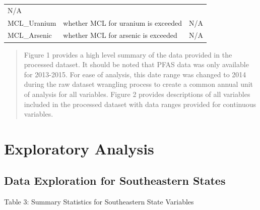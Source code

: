 \documentclass[12pt,]{article}
\begin{document}
\begin{longtable}[]{@{}lll@{}}
\begin{minipage}[t]{0.23\columnwidth}
N/A\strut
\end{minipage}\tabularnewline
\begin{minipage}[t]{0.22\columnwidth}\raggedright
MCL\_Uranium\strut
\end{minipage} & \begin{minipage}[t]{0.46\columnwidth}\raggedright
whether MCL for uranium is exceeded\strut
\end{minipage} & \begin{minipage}[t]{0.23\columnwidth}\raggedright
N/A\strut
\end{minipage}\tabularnewline
\begin{minipage}[t]{0.22\columnwidth}\raggedright
MCL\_Arsenic\strut
\end{minipage} & \begin{minipage}[t]{0.46\columnwidth}\raggedright
whether MCL for arsenic is exceeded\strut
\end{minipage} & \begin{minipage}[t]{0.23\columnwidth}\raggedright
N/A\strut
\end{minipage}\tabularnewline
\bottomrule
\end{longtable}

\begin{quote}
Figure 1 provides a high level summary of the data provided in the
processed dataset. It should be noted that PFAS data was only available
for 2013-2015. For ease of analysis, this date range was changed to 2014
during the raw dataset wrangling process to create a common annual unit
of analysis for all variables. Figure 2 provides descriptions of all
variables included in the processed dataset with data ranges provided
for continuous variables.
\end{quote}

\newpage

\hypertarget{exploratory-analysis}{%
\section{Exploratory Analysis}\label{exploratory-analysis}}

\hypertarget{data-exploration-for-southeastern-states}{%
\subsection{Data Exploration for Southeastern
States}\label{data-exploration-for-southeastern-states}}

Table 3: Summary Statistics for Southeastern State Variables
\end{document}
